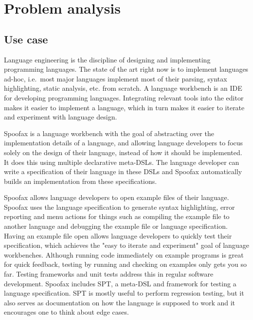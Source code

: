 
\section{Problem analysis}
\label{sec:problem_analysis}

\subsection{Use case}
\label{subsec:problem_analysis__use_case}

Language engineering is the discipline of designing and implementing programming languages.
The state of the art right now is to implement languages ad-hoc, i.e.\ most major languages implement most of their parsing, syntax highlighting, static analysis, etc. from scratch.
A language workbench is an \ac{IDE} for developing programming languages.
Integrating relevant tools into the editor makes it easier to implement a language, which in turn makes it easier to iterate and experiment with language design.

Spoofax is a language workbench with the goal of abstracting over the implementation details of a language, and allowing language developers to focus solely on the design of their language, instead of how it should be implemented.
It does this using multiple declarative meta-\acp{DSL}.
The language developer can write a specification of their language in these \acp{DSL} and Spoofax automatically builds an implementation from these specifications.

Spoofax allows language developers to open example files of their language.
Spoofax uses the language specification to generate syntax highlighting, error reporting and menu actions for things such as compiling the example file to another language and debugging the example file or language specification.
Having an example file open allows language developers to quickly test their specification, which achieves the "easy to iterate and experiment" goal of language workbenches.
Although running code immediately on example programs is great for quick feedback, testing by running and checking on examples only gets you so far.
Testing frameworks and unit tests address this in regular software development.
Spoofax includes SPT, a meta-DSL and framework for testing a language specification.
SPT is mostly useful to perform regression testing, but it also serves as documentation on how the language is supposed to work and it encourages one to think about edge cases.

